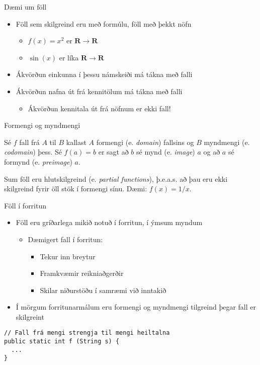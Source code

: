 \documentclass{beamer}
\begin{document}
\begin{frame}{Dæmi um föll}
\begin{itemize}
 \item Föll sem skilgreind eru með formúlu, föll með þekkt nöfn
 \begin{itemize}
  \item $f(x) = x^2$ er $\mathbf{R} \to \mathbf{R}$
  \item $\sin(x)$ er líka $\mathbf{R} \to \mathbf{R}$
 \end{itemize}
 \item Ákvörðun einkunna í þessu námskeiði má tákna með falli
 \item Ákvörðun nafna út frá kennitölum má tákna með falli \pause
 \begin{itemize}
  \item Ákvörðun kennitala út frá nöfnum er ekki fall!
 \end{itemize}
\end{itemize}
\end{frame}

\begin{frame}{Formengi og myndmengi}
\begin{tcolorbox}[title=Formengi og myndmengi]
Sé $f$ fall frá $A$ til $B$ kallast $A$ formengi (e. \emph{domain}) fallsins og $B$ myndmengi (e. \emph{codomain}) þess. Sé $f(a) = b$ er sagt að $b$ sé mynd (e. \emph{image}) $a$ og að $a$ sé formynd (e. \emph{preimage}) $a$.
\end{tcolorbox}
Sum föll eru hlutskilgreind (e. \emph{partial functions}), þ.e.a.s. að þau eru ekki skilgreind fyrir öll stök í formengi sínu. Dæmi: $f(x) = 1/x$.
\end{frame}

\begin{frame}[fragile]{Föll í forritun}
\begin{itemize}
 \item Föll eru gríðarlega mikið notuð í forritun, í ýmsum myndum
 \begin{itemize}
  \item Dæmigert fall í forritun:
  \begin{itemize}
   \item Tekur inn breytur
   \item Framkvæmir reikniaðgerðir
   \item Skilar niðurstöðu í samræmi við inntakið 
  \end{itemize}
 \end{itemize}
 \item Í mörgum forritunarmálum eru formengi og myndmengi tilgreind þegar fall er skilgreint
\end{itemize}
\begin{verbatim}
// Fall frá mengi strengja til mengi heiltalna
public static int f (String s) {
  ...
}
\end{verbatim}

\end{frame}
\end{document}
